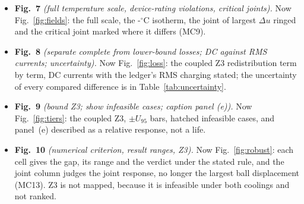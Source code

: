 \documentclass[10pt]{article}
\begin{document}
\begin{itemize}
{the 12.5\,\% and 16.5\,\% discrepancies).} Now Fig.~\ref{fig:verif}: matched-reference checks only,
including the complete package; discretization is in Table~\ref{tab:uncertainty} and the local model
in Table~\ref{S:tab:supp-localchecks}. The two discrepancies are explained in MC12.
\item \textbf{Fig.~7} \emph{(full temperature scale, device-rating violations, critical joints).} Now
Fig.~\ref{fig:fields}: the full scale, the \MthLimGan-$^\circ$C isotherm, the joint of largest
$\Delta u$ ringed and the critical joint marked where it differs (MC9).
\item \textbf{Fig.~8} \emph{(separate complete from lower-bound losses; DC against RMS currents;
uncertainty).} Now Fig.~\ref{fig:loss}: the coupled Z3 redistribution term by term, DC currents with
the ledger's RMS charging stated; the uncertainty of every compared difference is in
Table~\ref{tab:uncertainty}.
\item \textbf{Fig.~9} \emph{(bound Z3; show infeasible cases; caption panel (e)).} Now
Fig.~\ref{fig:tiers}: the coupled Z3, $\pm U_{95}$ bars, hatched infeasible cases, and panel~(e)
described as a relative response, not a life.
\item \textbf{Fig.~10} \emph{(numerical criterion, result ranges, Z3).} Now Fig.~\ref{fig:robust}:
each cell gives the gap, its range and the verdict under the stated rule, and the joint column judges
the joint response, no longer the largest ball displacement (MC13). Z3 is not mapped, because it is
infeasible under both coolings and not ranked.
\end{itemize}
\end{document}
